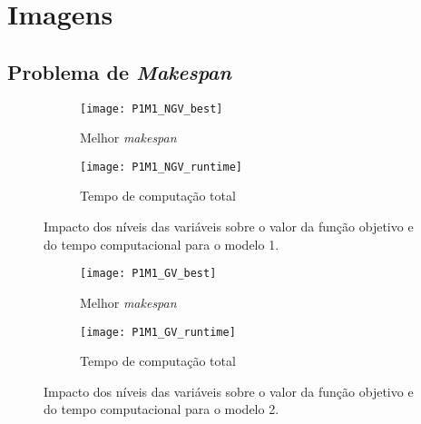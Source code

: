 
%


\epigraphfontsize{\small\itshape}
\setlength\epigraphwidth{12.5cm}
\setlength\epigraphrule{0pt}

\appendix
\chapter{Imagens}
\label{chp:imagens}

\section{Problema de \textit{Makespan}}

\begin{figure}[H]
	\centering
	\begin{subfigure}{0.49\textwidth}
	\centering
		\texttt{[image: P1M1\_NGV\_best]}
		\caption{Melhor \textit{makespan}}
		\label{fig:P1M1_NGV_best}
	\end{subfigure}
	\begin{subfigure}{0.49\textwidth}
	\centering
		\texttt{[image: P1M1\_NGV\_runtime]}
		\caption{Tempo de computação total}
		\label{fig:P1M1_NGV_runtime}
	\end{subfigure}
	\caption{Impacto dos níveis das variáveis sobre o valor da função objetivo e do tempo computacional para o modelo 1.}
	\label{fig:P1M1_NGV_alt}
\end{figure}

\begin{figure}[H]
	\centering
	\begin{subfigure}{0.49\textwidth}
	\centering
		\texttt{[image: P1M1\_GV\_best]}
		\caption{Melhor \textit{makespan}}
		\label{fig:P1M1_GV_best}
	\end{subfigure}
	\begin{subfigure}{0.49\textwidth}
	\centering
		\texttt{[image: P1M1\_GV\_runtime]}
		\caption{Tempo de computação total}
		\label{fig:P1M1_GV_runtime}
	\end{subfigure}
	\caption{Impacto dos níveis das variáveis sobre o valor da função objetivo e do tempo computacional para o modelo 2.}
	\label{fig:P1M1_GV_alt}
\end{figure}

